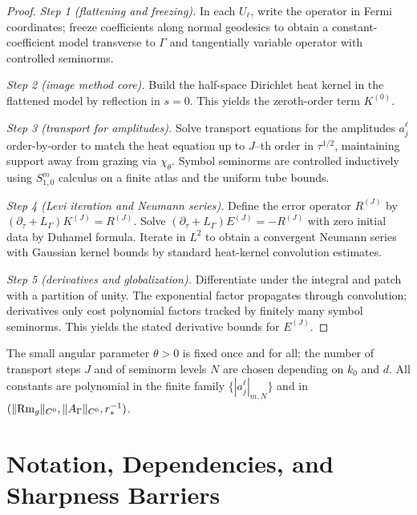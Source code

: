 \begin{proof}[Proof]
\emph{Step 1 (flattening and freezing).} In each $U_\ell$, write the operator in Fermi coordinates; freeze coefficients along normal geodesics to obtain a constant-coefficient model transverse to $\Gamma$ and tangentially variable operator with controlled seminorms.

\emph{Step 2 (image method core).} Build the half-space Dirichlet heat kernel in the flattened model by reflection in $s=0$. This yields the zeroth-order term $K^{(0)}$.

\emph{Step 3 (transport for amplitudes).} Solve transport equations for the amplitudes $a_j^\ell$ order-by-order to match the heat equation up to $J$–th order in $\tau^{1/2}$, maintaining support away from grazing via $\chi_\theta$. Symbol seminorms are controlled inductively using $S^m_{1,0}$ calculus on a finite atlas and the uniform tube bounds.

\emph{Step 4 (Levi iteration and Neumann series).} Define the error operator $R^{(J)}$ by $(\partial_\tau + L_\Gamma)K^{(J)} = R^{(J)}$. Solve $(\partial_\tau + L_\Gamma)E^{(J)} = -R^{(J)}$ with zero initial data by Duhamel formula. Iterate in $L^2$ to obtain a convergent Neumann series with Gaussian kernel bounds by standard heat-kernel convolution estimates.

\emph{Step 5 (derivatives and globalization).} Differentiate under the integral and patch with a partition of unity. The exponential factor propagates through convolution; derivatives only cost polynomial factors tracked by finitely many symbol seminorms. This yields the stated derivative bounds for $E^{(J)}$.
\end{proof}

\begin{remark}
The small angular parameter $\theta>0$ is fixed once and for all; the number of transport steps $J$ and of seminorm levels $N$ are chosen depending on $k_0$ and $d$. All constants are polynomial in the finite family $\{|a_j^\ell|_{m,N}\}$ and in $(\|{\rm Rm}_g\|_{C^0},\|A_\Gamma\|_{C^0},r_*^{-1})$.
\end{remark}

\section{Notation, Dependencies, and Sharpness Barriers}
\label{sec:notation-audit}


